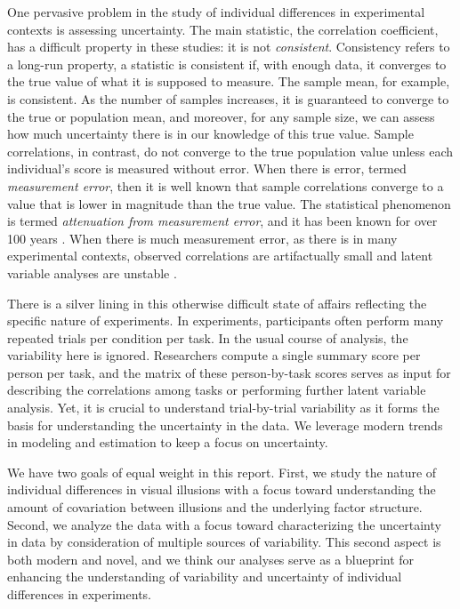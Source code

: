 \documentclass[man, 12pt]{apa7} %
\begin{document}
One pervasive problem in the study of individual differences in experimental contexts is assessing uncertainty.  The main statistic, the correlation coefficient, has a difficult property in these studies: it is not \textit{consistent}.  Consistency refers to a long-run property, a statistic is consistent if, with enough data, it converges to the true value of what it is supposed to measure.  The sample mean, for example, is consistent.  As the number of samples increases, it is guaranteed to converge to the true or population mean, and moreover, for any sample size, we can assess how much uncertainty there is in our knowledge of this true value. Sample correlations, in contrast, do not converge to the true population value unless each individual's score is measured without error.  When there is error, termed \textit{measurement error}, then it is well known that sample correlations converge to a value that is lower in magnitude than the true value.  The statistical phenomenon is termed \textit{attenuation from measurement error}, and it has been known for over 100 years \parencite[]{Galton.1888, Spearman.1904}. When there is much measurement error, as there is in many experimental contexts, observed correlations are artifactually small and latent variable analyses are unstable \parencite[]{Rouder.etal.2024, Hedge.etal.2018, Karr.etal.2018}.

There is a silver lining in this otherwise difficult state of affairs reflecting the specific nature of experiments.  In experiments, participants often perform many repeated trials per condition per task.  In the usual course of analysis, the variability here is ignored.  Researchers compute a single summary score per person per task, and the matrix of these person-by-task scores serves as input for describing the correlations among tasks or performing further latent variable analysis.  Yet, it is crucial to understand trial-by-trial variability as it forms the basis for understanding the uncertainty in the data.  We leverage modern trends in modeling and estimation to keep a focus on uncertainty.


We have two goals of equal weight in this report.  First, we study the nature of individual differences in visual illusions with a focus toward understanding the amount of covariation between illusions and the underlying factor structure.  Second, we analyze the data with a focus toward characterizing the uncertainty in data by consideration of multiple sources of variability.  This second aspect is both modern and novel, and we think our analyses serve as a blueprint for enhancing the understanding of variability and uncertainty of individual differences in experiments.
\end{document}
